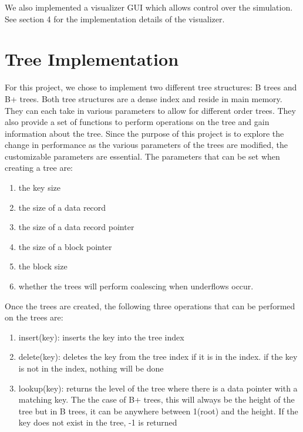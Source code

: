 \documentclass[fleqn]{article}
\begin{document}
We also implemented a visualizer GUI which allows control over the simulation.  See section 4 for the implementation details of the visualizer.

\section{Tree Implementation}

For this project, we chose to implement two different tree structures: B trees and B+ trees.  Both tree structures are a dense index and reside in main memory.  They can each take in various parameters to allow for different order trees.  They also provide a set of functions to perform operations on the tree and gain information about the tree.  Since the purpose of this project is to explore the change in performance as the various parameters of the trees are modified, the customizable parameters are essential.  The parameters that can be set when creating a tree are:

\begin{enumerate}
\item
the key size
\item
the size of a data record
\item
the size of a data record pointer
\item
the size of a block pointer
\item
the block size
\item
whether the trees will perform coalescing when underflows occur.
\end{enumerate}
Once the trees are created, the following three operations that can be performed on the trees are:
\begin{enumerate}
\item
insert(key):  inserts the key into the tree index
\item
delete(key): deletes the key from the tree index if it is in the index.  if the key is not in the index, nothing will be done
\item
lookup(key): returns the level of the tree where there is a data pointer with a matching key.  The the case of B+ trees, this will always be the height of the tree but in B trees, it can be anywhere between 1(root) and the height.  If the key does not exist in the tree, -1 is returned
\end{enumerate}
\end{document}

